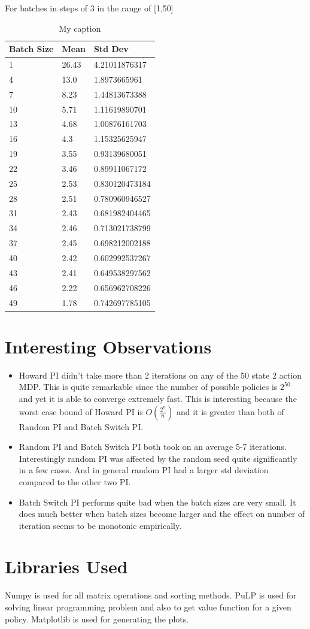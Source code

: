 \documentclass{article}
\begin{document}
For batches in steps of 3 in the range of [1,50]
\begin{table}[H]
\centering
\caption{My caption}
\label{t:bspi_batches}
\begin{tabular}{|l|l|l|}
\hline
Batch Size & Mean  & Std Dev        \\ \hline
1          & 26.43 & 4.21011876317  \\ \hline
4          & 13.0  & 1.8973665961   \\ \hline
7          & 8.23  & 1.44813673388  \\ \hline
10         & 5.71  & 1.11619890701  \\ \hline
13         & 4.68  & 1.00876161703  \\ \hline
16         & 4.3   & 1.15325625947  \\ \hline
19         & 3.55  & 0.93139680051  \\ \hline
22         & 3.46  & 0.89911067172  \\ \hline
25         & 2.53  & 0.830120473184 \\ \hline
28         & 2.51  & 0.780960946527 \\ \hline
31         & 2.43  & 0.681982404465 \\ \hline
34         & 2.46  & 0.713021738799 \\ \hline
37         & 2.45  & 0.698212002188 \\ \hline
40         & 2.42  & 0.602992537267 \\ \hline
43         & 2.41  & 0.649538297562 \\ \hline
46         & 2.22  & 0.656962708226 \\ \hline
49         & 1.78  & 0.742697785105 \\ \hline
\end{tabular}
\end{table}

\section{Interesting Observations}
\begin{itemize}
\item Howard PI didn't take more than 2 iterations on any of the 50 state 2 action MDP. This is quite remarkable since the number of possible policies is $2^{50}$ and yet it is able to converge extremely fast. This is interesting because the worst case bound of Howard PI is $O(\frac{2^n}{n})$ and it is greater than both of Random PI and Batch Switch PI.
\item Random PI and Batch Switch PI both took on an average 5-7 iterations. Interestingly random PI was affected by the random seed quite significantly in a few cases. And in general random PI had a larger std deviation compared to the other two PI.
\item Batch Switch PI performs quite bad when the batch sizes are very small. It does much better when batch sizes become larger and the effect on number of iteration seems to be monotonic empirically.
\end{itemize}

\section{Libraries Used}
Numpy is used for all matrix operations and sorting methods. PuLP is used for solving linear programming problem and also to get value function for a given policy. Matplotlib is used for generating the plots.
\end{document}

